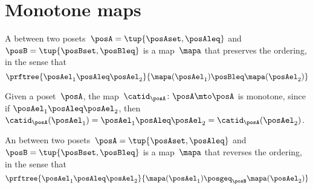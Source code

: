 

\section{Monotone maps}\label{sec:monotonicity-monotone-maps}


\begin{definition}
    \label{def:monotone}
    A \emph{} between two posets~$\posA=\tup{\posAset, \posAleq}$ and~$\posB=\tup{\posBset, \posBleq}$ is a map~$\mapa$ that preserves the ordering, in the sense that
    \begin{equation}
        \prftree{\posAel_1 \posAleq \posAel_2 }{\mapa(\posAel_1) \posBleq \mapa(\posAel_2)}
    \end{equation}
\end{definition}

\begin{remark}
    Given a poset~$\posA$, the map~$\catid_\posA\colon \posA \mto \posA$ is monotone, since if $\posAel_1\posAleq \posAel_2$, then $\catid_\posA(\posAel_1)=\posAel_1 \posAleq  \posAel_2 =  \catid_\posA(\posAel_2 )$.

\end{remark}

\begin{definition}
    \label{def:antitone}
    An \emph{} between two posets~$\posA=\tup{\posAset, \posAleq}$ and~$\posB=\tup{\posBset, \posBleq}$ is a map~$\mapa$ that reverses the ordering, in the sense that
    \begin{equation}
        \prftree{\posAel_1 \posAleq \posAel_2}{\mapa(\posAel_1) \posgeq_\posB \mapa(\posAel_2)}
    \end{equation}
\end{definition}


